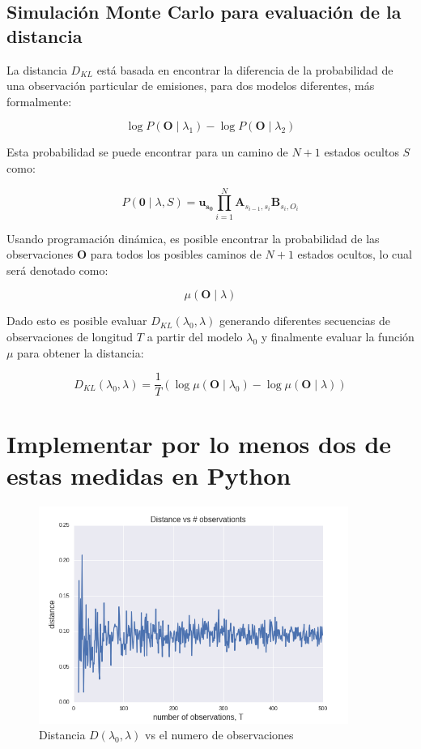 \documentclass[a4paper]{article}
\begin{document}
\subsection{Simulación Monte Carlo para evaluación de la distancia}

La distancia $D_{KL}$ está basada en encontrar la diferencia de
la probabilidad de una observación particular de emisiones, para
dos modelos diferentes, más formalmente:

$$
  \log P(\mathbf{O} \mid \lambda_1) - \log P(\mathbf{O} \mid \lambda_2)
$$

Esta probabilidad se puede encontrar para un camino de $N + 1$ estados
ocultos $S$ como:

$$
P(\mathbf{0} \mid \lambda, S) = \mathbf{u_{s_0}} \prod_{i = 1}^{N}
  \mathbf{A}_{s_{i - 1}, s_{i}} \mathbf{B}_{s_i, O_i}
$$

Usando programación dinámica, es posible encontrar la
probabilidad de las observaciones $\mathbf{O}$ para todos los posibles
caminos de $N + 1$ estados ocultos, lo cual será denotado como:

$$
\mu(\mathbf{O} \mid \lambda)
$$

Dado esto es posible evaluar $D_{KL}(\lambda_0, \lambda)$ generando
diferentes secuencias de observaciones de longitud $T$ a partir
del modelo $\lambda_0$ y finalmente evaluar la función $\mu$
para obtener la distancia:

$$
D_{KL}(\lambda_0, \lambda) =
\frac{1}{T} (\log \mu(\mathbf{O} \mid \lambda_0) -
\log \mu(\mathbf{O} \mid \lambda))
$$

\section{Implementar por lo menos dos de estas medidas en Python}
\label{sec:theory}

\begin{figure}[H]
  \centering
  \includegraphics[width=0.9\textwidth]{./img/dist_conver3.png}
  \caption{\label{fig:conver} Distancia $D(\lambda_0, \lambda)$ vs el numero de observaciones}
\end{figure}
\end{document}
